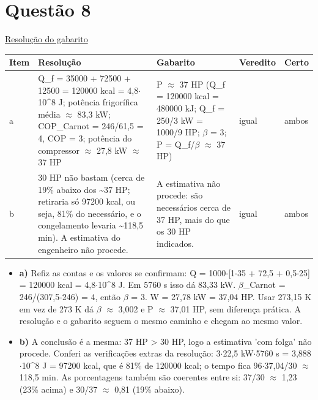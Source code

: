 \documentclass{article}%
\begin{document}
\section*{Questão 8}%
\href{https://poliedroresolve.sistemapoliedro.com.br/vestibulares/ime/2026/ime-2-fase-dia-2-24-10-2025-2-fase-dia-2/dissertativa-8-fisica-2-fase-dia-2-ime-2026}{Resolução do gabarito}\par\smallskip%
\begin{longtable}{@{}p{} p{} p{} p{} p{}@{}}\toprule Item & Resolução & Gabarito & Veredito & Certo \\ \midrule
a & Q\_f = 35000 + 72500 + 12500 = 120000 kcal = 4,8$\cdot$10\^{}8 J; potência frigorífica média $\approx$ 83,3 kW; COP\_Carnot = 246/61,5 = 4, COP = 3; potência do compressor $\approx$ 27,8 kW $\approx$ 37 HP & P $\approx$ 37 HP (Q\_f = 120000 kcal = 480000 kJ; Q\_f = 250/3 kW = 1000/9 HP; $\beta$ = 3; P = Q\_f/$\beta$ $\approx$ 37 HP) & igual & ambos \\
b & 30 HP não bastam (cerca de 19\% abaixo dos \textasciitilde{}37 HP; retiraria só 97200 kcal, ou seja, 81\% do necessário, e o congelamento levaria \textasciitilde{}118,5 min). A estimativa do engenheiro não procede. & A estimativa não procede: são necessários cerca de 37 HP, mais do que os 30 HP indicados. & igual & ambos \\
\bottomrule\end{longtable}%
\begin{itemize}%
\item%
\textbf{a)} Refiz as contas e os valores se confirmam: Q = 1000$\cdot${[}1$\cdot$35 + 72,5 + 0,5$\cdot$25{]} = 120000 kcal = 4,8$\cdot$10\^{}8 J. Em 5760 s isso dá 83,33 kW. $\beta$\_Carnot = 246/(307,5-246) = 4, então $\beta$ = 3. W = 27,78 kW = 37,04 HP. Usar 273,15 K em vez de 273 K dá $\beta$ $\approx$ 3,002 e P $\approx$ 37,01 HP, sem diferença prática. A resolução e o gabarito seguem o mesmo caminho e chegam ao mesmo valor.%
\item%
\textbf{b)} A conclusão é a mesma: 37 HP > 30 HP, logo a estimativa 'com folga' não procede. Conferi as verificações extras da resolução: 3$\cdot$22,5 kW$\cdot$5760 s = 3,888$\cdot$10\^{}8 J = 97200 kcal, que é 81\% de 120000 kcal; o tempo fica 96$\cdot$37,04/30 $\approx$ 118,5 min. As porcentagens também são coerentes entre si: 37/30 $\approx$ 1,23 (23\% acima) e 30/37 $\approx$ 0,81 (19\% abaixo).%
\end{itemize}%
\end{document}
